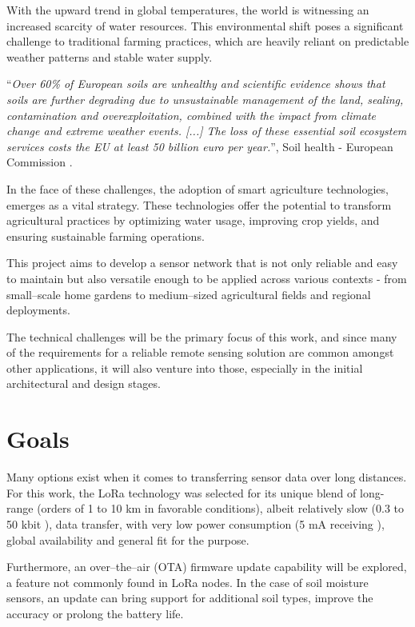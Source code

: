 
With the upward trend in global temperatures, the world is witnessing an increased scarcity of water resources. This environmental shift poses a significant challenge to traditional farming practices, which are heavily reliant on predictable weather patterns and stable water supply. 

``\emph{Over 60\% of European soils are unhealthy and scientific evidence shows that soils are further degrading due to unsustainable management of the land, sealing, contamination and overexploitation, combined with the impact from climate change and extreme weather events. [...] The loss of these essential soil ecosystem services costs the EU at least 50 billion euro per year.}'', Soil health - European Commission \cite{european_commission_soil_2024}.

In the face of these challenges, the adoption of smart agriculture technologies, emerges as a vital strategy. These technologies offer the potential to transform agricultural practices by optimizing water usage, improving crop yields, and ensuring sustainable farming operations.

This project aims to develop a sensor network that is not only reliable and easy to maintain but also versatile enough to be applied across various contexts - from small--scale home gardens to medium--sized agricultural fields and regional deployments. 

The technical challenges will be the primary focus of this work, and since many of the requirements for a reliable remote sensing solution are common amongst other applications, it will also venture into those, especially in the initial architectural and design stages. 

\section{Goals}
Many options exist when it comes to transferring sensor data over long distances. For this work, the LoRa technology was selected for its unique blend of long-range (orders of 1 to 10 km in favorable conditions), albeit relatively slow (0.3 to 50 kbit \cite{semtech_corporation_sx12612_2024}), data transfer, with very low power consumption (5 mA receiving \cite{semtech_corporation_sx12612_2024}), global availability and general fit for the purpose.

Furthermore, an over--the--air (OTA) firmware update capability will be explored, a feature not commonly found in LoRa nodes. In the case of soil moisture sensors, an update can bring support for additional soil types, improve the accuracy or prolong the battery life. 

